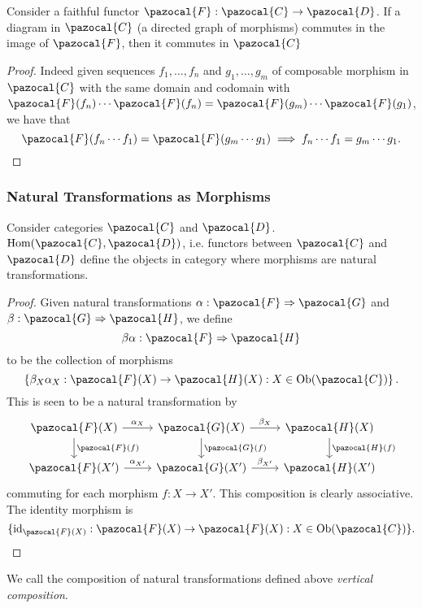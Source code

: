     \begin{lemma}
        Consider a faithful functor $\pazocal{F}: \pazocal{C} \rightarrow \pazocal{D}$. If a diagram in $\pazocal{C}$ (a directed graph of morphisms) commutes in the image of $\pazocal{F}$, then it commutes in $\pazocal{C}$
    \end{lemma}
    \begin{proof}
        Indeed given sequences $f_1,\dots, f_n$ and $g_1,\dots,g_m$ of composable morphism in $\pazocal{C}$ with the same domain and codomain with $\pazocal{F}(f_n) \cdots \pazocal{F}(f_n) = \pazocal{F}(g_m)\cdots \pazocal{F}(g_1)$, we have that 
        $$\pazocal{F}(f_n\cdots f_1) = \pazocal{F}(g_m\cdots g_1) \implies f_n\cdots f_1 = g_m\cdots g_1.$$
    \end{proof}
\subsubsection{Natural Transformations as Morphisms}
\begin{proposition}
    Consider categories $\pazocal{C}$ and $\pazocal{D}$. $\Hom(\pazocal{C},\pazocal{D})$, i.e. functors between $\pazocal{C}$ and $\pazocal{D}$ define the objects in category where morphisms are natural transformations.
\end{proposition}
\begin{proof}
    Given natural transformations $\alpha: \pazocal{F} \Rightarrow \pazocal{G}$ and $\beta : \pazocal{G}\Rightarrow \pazocal{H}$, we define 
    $$\beta\alpha : \pazocal{F} \Rightarrow \pazocal{H}$$
    to be the collection of morphisms
    $$\left\{\beta_{X}\alpha_X : \pazocal{F}(X)\rightarrow \pazocal{H}(X) : X\in \Ob(\pazocal{C})\right\}.$$
    This is seen to be a natural transformation by  
    $$
        \begin{tikzcd}
            \pazocal{F}(X) \arrow[r, "\alpha_X"] \arrow[d,"\pazocal{F}(f)"] & \pazocal{G}(X)\arrow[d,"\pazocal{G}(f)"]\arrow[r,"\beta_X"] & \pazocal{H}(X)\arrow[d,"\pazocal{H}(f)"]\\
            \pazocal{F}(X') \arrow[r,"\alpha_{X'}"] & \pazocal{G}(X') \arrow[r,"\beta_{X'}"] & \pazocal{H}(X')
        \end{tikzcd}
    $$ 
    commuting for each morphism $f: X\rightarrow X'$. This composition is clearly associative. The identity morphism is 
    $$\{\id_{\pazocal{F}(X)}: \pazocal{F}(X)\rightarrow \pazocal{F}(X): X\in \Ob(\pazocal{C})\}.$$
\end{proof}
\begin{remark}
    We call the composition of natural transformations defined above \emph{vertical composition}.
\end{remark}
